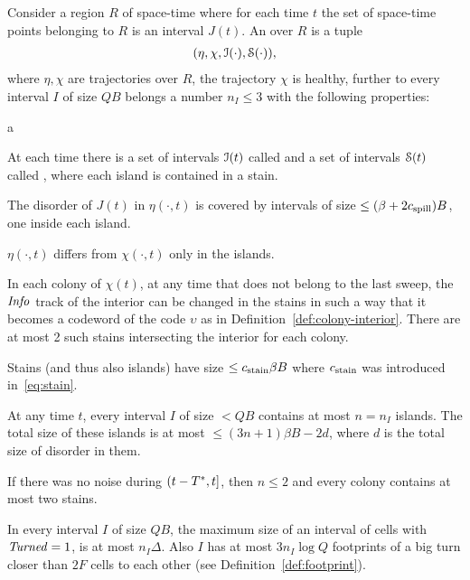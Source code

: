 \documentclass[11pt]{memoir}
\theoremstyle{definition} %
\renewcommand{\le}{\leq}
\newcommand{\fld}[1]{\ensuremath{\textit{#1\/}}}
\def\B{B}
\newcommand{\F}{F}
\newcommand{\Q}{Q} %
\newcommand{\Tus}{T^{*}}
\newcommand{\Info}{\fld{Info}}
\newcommand{\Turned}{\fld{Turned}} %
\newcommand{\cns}[1]{c_{\textrm{\upshape #1}}}
\newcommand{\CSpill}{\cns{spill}}
\begin{document}
\begin{definition}[Annotation]\label{def:annotation}
  Consider a region \( R \) of space-time where for each time \( t \) the set of space-time points
  belonging to \( R \) is an interval \( J(t) \).  
  An  over \( R \) is a tuple
  \begin{align*}
    (\eta, \chi, \mathcal{I}(\cdot), \mathcal{S}(\cdot)),
  \end{align*}
  where \( \eta,\chi \) are trajectories over \( R \), the trajectory \( \chi \) is healthy,  further
  to every interval \( I \) of size \( \Q\B \) belongs a
  number \( n_{I}\le 3 \) with the following properties:
  \begin{varenum}[series=annotated]{a}

  \item\label{i:islands,stains} At each time there is a set of intervals \( \mathcal{I}(t) \) called 
    and a set of intervals \( \mathcal{S}(t) \) called , where each island is contained in a stain.

  The disorder of \( J(t) \) in \( \eta(\cdot,t) \)
  is covered by intervals of size \( \le (\beta+2\CSpill)\B \), one inside each island.
    
  \( \eta(\cdot,t) \) differs from \( \chi(\cdot,t) \) only in the islands.

  \item In each colony of \( \chi(t) \), at any time that does not belong to the last sweep,
    the \( \Info \) track of the interior can be changed in the stains in such a way that it becomes
    a codeword of the code \( \upsilon \) as in Definition~\ref{def:colony-interior}.
    There are at most 2 such stains intersecting the interior for each colony.
   
  \item Stains (and thus also islands) have size \( \le\cns{stain}\beta\B \)
    where \( \cns{stain} \) was introduced in~\eqref{eq:stain}.

  \item\label{i:n} At any time \( t \), every interval \( I \) of size \( <\Q\B \) contains
    at most \( n=n_{I} \) islands.
    The total size of these islands is at most \( \le (3n+1)\beta\B - 2d \),
    where \( d \) is the total size of disorder in them.

    If there was no noise during  \( \rint{t-\Tus}{t} \), then \( n\le 2 \) and
    every colony contains at most two stains.

  \item\label{i:turned}
    In every interval \( I \) of size \( \Q\B \), the maximum size of an interval of cells with 
    \( \Turned=1 \), is at most \( n_{I}\Delta \).
    Also \( I \) has at most \( 3n_{I}\log\Q \) footprints of a big turn closer than \( 2\F \)
    cells to each other (see Definition~\ref{def:footprint}). 


\end{varenum}
\end{definition}
\end{document}
